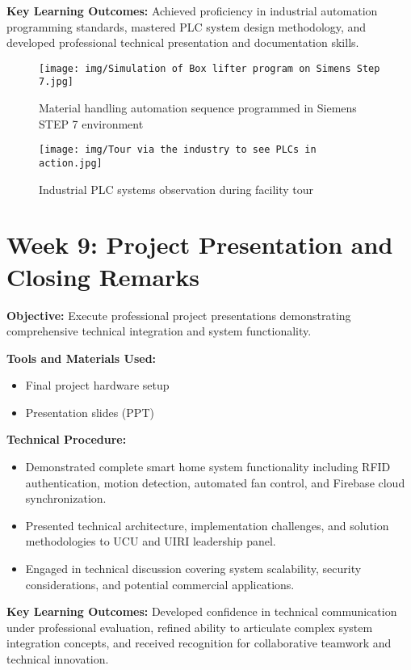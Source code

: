\documentclass[12pt,a4paper]{report}
\begin{document}
\noindent\textbf{Key Learning Outcomes:} Achieved proficiency in industrial automation programming standards, mastered PLC system design methodology, and developed professional technical presentation and documentation skills.

\begin{figure}[H]
\centering
\texttt{[image: img/Simulation of Box lifter program on Simens Step 7.jpg]}
\caption{Material handling automation sequence programmed in Siemens STEP 7 environment}
\label{fig:step7-simulation}
\end{figure}

\begin{figure}[H]
\centering
\texttt{[image: img/Tour via the industry to see PLCs in action.jpg]}
\caption{Industrial PLC systems observation during facility tour}
\label{fig:plc-tour}
\end{figure}

\section{Week 9: Project Presentation and Closing Remarks}

\textbf{Objective:} Execute professional project presentations demonstrating comprehensive technical integration and system functionality.

\textbf{Tools and Materials Used:}
\begin{itemize}
    \item Final project hardware setup
    \item Presentation slides (PPT)
\end{itemize}

\textbf{Technical Procedure:}
\noindent
\begin{itemize}
    \item Demonstrated complete smart home system functionality including RFID authentication, motion detection, automated fan control, and Firebase cloud synchronization.
    \item Presented technical architecture, implementation challenges, and solution methodologies to UCU and UIRI leadership panel.
    \item Engaged in technical discussion covering system scalability, security considerations, and potential commercial applications.
\end{itemize}

\noindent\textbf{Key Learning Outcomes:} Developed confidence in technical communication under professional evaluation, refined ability to articulate complex system integration concepts, and received recognition for collaborative teamwork and technical innovation.
\end{document}
